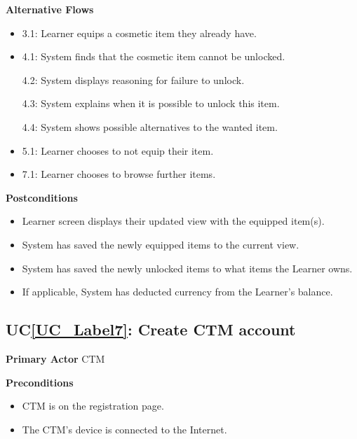 \documentclass[12pt]{article}
\newcounter{ucnum} %
\newcommand{\ucref}[1]{UC\ref{#1}}
\begin{document}
\textbf{Alternative Flows}
\begin{itemize}
\item 3.1: Learner equips a cosmetic item they already have.

\item 4.1: System finds that the cosmetic item cannot be unlocked.

4.2: System displays reasoning for failure to unlock.

4.3: System explains when it is possible to unlock this item.

4.4: System shows possible alternatives to the wanted item.

\item 5.1: Learner chooses to not equip their item.

\item 7.1: Learner chooses to browse further items.

\end{itemize}

\textbf{Postconditions}
\begin{itemize}
\item Learner screen displays their updated view with the equipped item(s).
\item System has saved the newly equipped items to the current view.
\item System has saved the newly unlocked items to what items the Learner owns.
\item If applicable, System has deducted currency from the Learner's balance.
\end{itemize}

 \label{UC_Label7}
\subsection{\ucref{UC_Label7}: Create CTM account}

\textbf{Primary Actor}
CTM

\textbf{Preconditions}
\begin{itemize}
\item CTM is on the registration page.
\item The CTM's device is connected to the Internet.
\end{itemize}
\end{document}
